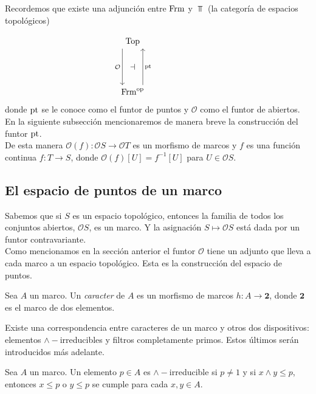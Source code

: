Recordemos que existe una adjunción entre $\mathrm{Frm}$ y $\Top$ (la categoría de espacios topológicos)

\[\begin{tikzcd}
	{\Top} \\
	{} & {} & {} \\
	{\Frm^{\op}}
	\arrow["{\pt}"{name=0, swap}, from=3-1, to=1-1, shift right=5]
	\arrow["{\mathcal{O}}"{name=1, swap}, from=1-1, to=3-1, shift right=5]
	\arrow["\dashv"{rotate=0}, from=1, to=0, phantom]
\end{tikzcd}\]
donde $\mathrm{pt}$ se le conoce como el funtor de puntos y $\mathcal{O}$ como el funtor de abiertos. En la siguiente subsección mencionaremos de manera breve la construcción del funtor $\mathrm{pt}$.\\

De esta manera $\mathcal{O}(f)\colon \mathcal{O}S\to \mathcal{O}T$ es un morfismo de marcos y $f$ es una función continua $f\colon T\to S$, donde $\mathcal{O}(f)[U]=f^{-1}[U]$ para $U\in \mathcal{O}S$.

\subsection{El espacio de puntos de un marco}\label{Epuntos}

Sabemos que si $S$ es un espacio topológico, entonces la familia de todos los conjuntos abiertos, $\mathcal{O}S$, es un marco. Y la asignación $S\mapsto \mathcal{O}S$ está dada por un funtor contravariante.\\

Como mencionamos en la sección anterior el funtor $\mathcal{O}$ tiene un adjunto que lleva a cada marco a un espacio topológico. Esta es la construcción del espacio de puntos.

\begin{dfn}
    Sea $A$ un marco. Un \emph{caracter} de $A$ es un morfismo de marcos $h\colon A\to \mathbf{2}$, donde $\mathbf{2}$ es el marco de dos elementos.
\end{dfn}

Existe una correspondencia entre caracteres de un marco y otros dos dispositivos: elementos $\wedge-$irreducibles y filtros completamente primos. Estos últimos serán introducidos más adelante.

\begin{dfn}\label{infirre}
    Sea $A$ un marco. Un elemento $p\in A$ es $\wedge-$irreducible si $p\neq 1$ y si $x\wedge y\leq p$, entonces $x\leq p$ o $y\leq p$ se cumple para cada $x, y \in A$.
\end{dfn}

